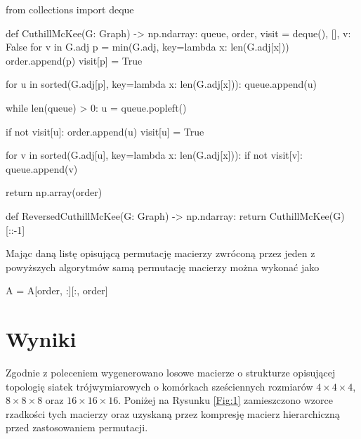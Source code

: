 \documentclass{../myclass}
\begin{document}
\begin{python}
from collections import deque

def CuthillMcKee(G: Graph) -> np.ndarray:
    queue, order, visit = deque(), [], {v: False for v in G.adj}
    p = min(G.adj, key=lambda x: len(G.adj[x]))
    order.append(p)
    visit[p] = True

    for u in sorted(G.adj[p], key=lambda x: len(G.adj[x])):
        queue.append(u)

    while len(queue) > 0:
        u = queue.popleft()

        if not visit[u]:
            order.append(u)
            visit[u] = True

            for v in sorted(G.adj[u], key=lambda x: len(G.adj[x])):
                if not visit[v]: queue.append(v)

    return np.array(order)
\end{python}

\begin{python}
def ReversedCuthillMcKee(G: Graph) -> np.ndarray:
    return CuthillMcKee(G)[::-1]
\end{python}

Mając daną listę  opisującą permutację macierzy zwróconą przez jeden z powyższych algorytmów samą permutację macierzy  można wykonać jako
\begin{python}
A = A[order, :][:, order]
\end{python}

\section{Wyniki}

Zgodnie z poleceniem wygenerowano losowe macierze o strukturze opisującej topologię siatek
trójwymiarowych o komórkach sześciennych rozmiarów \(4\times 4\times 4\), \(8 \times 8 \times 8\)
oraz \(16\times16\times16\). Poniżej na Rysunku \ref{Fig:1} zamieszczono wzorce rzadkości tych
macierzy oraz uzyskaną przez kompresję macierz hierarchiczną przed zastosowaniem permutacji.
\end{document}
